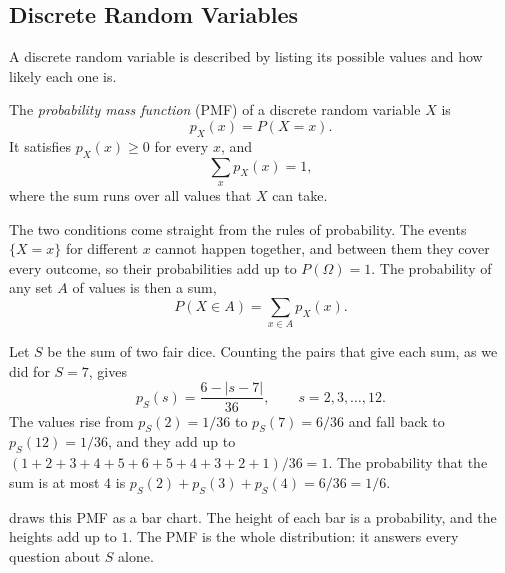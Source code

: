 \subsection{Discrete Random Variables}
\label{sec:ch05-discrete}

A discrete random variable is described by listing its possible values
and how likely each one is.

\begin{definition}
  \label{def:pmf}
  The \emph{probability mass function} (PMF) of a discrete random
  variable $X$ is
  \[
    p_X(x) = P(X = x).
  \]
  It satisfies $p_X(x) \ge 0$ for every $x$, and
  \[
    \sum_x p_X(x) = 1 ,
  \]
  where the sum runs over all values that $X$ can take.
\end{definition}

The two conditions come straight from the rules of probability. The
events $\{X = x\}$ for different $x$ cannot happen together, and between
them they cover every outcome, so their probabilities add up to
$P(\Omega) = 1$. The probability of any set $A$ of values is then a sum,
\[
  P(X \in A) = \sum_{x \in A} p_X(x) .
\]

\begin{example}
  \label{ex:ch05-dice}
  Let $S$ be the sum of two fair dice. Counting the pairs that give each
  sum, as we did for $S = 7$, gives
  \[
    p_S(s) = \frac{6 - |s - 7|}{36}, \qquad s = 2, 3, \dots, 12 .
  \]
  The values rise from $p_S(2) = 1/36$ to $p_S(7) = 6/36$ and fall back
  to $p_S(12) = 1/36$, and they add up to $(1 + 2 + 3 + 4 + 5 + 6 + 5 +
  4 + 3 + 2 + 1)/36 = 1$. The probability that the sum is at most $4$ is
  $p_S(2) + p_S(3) + p_S(4) = 6/36 = 1/6$.
\end{example}

 draws this PMF as a bar chart. The height of
each bar is a probability, and the heights add up to $1$. The PMF is the
whole distribution: it answers every question about $S$ alone.

